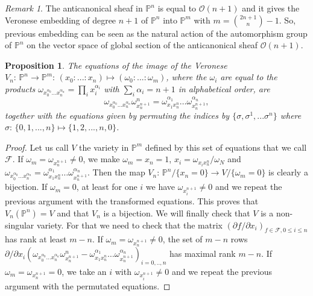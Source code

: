\documentclass[a4paper,10pt]{amsart}
\theoremstyle{plain}
\newtheorem{proposition}[theorem]{Proposition}
\theoremstyle{definition}
\theoremstyle{remark}
\newtheorem{remark}[theorem]{Remark}
\numberwithin{equation}{section}
\begin{document}
\begin{remark} The anticanonical sheaf in $\mathbb{P}^n$ is equal to $\mathcal{O}(n+1)$ \cite[8.20.1]{Hart} and it gives the Veronese embedding of degree $n+1$ of $\mathbb{P}^n$ into $\mathbb{P}^m$ with $m=\binom{2n+1}{n}-1$. So, previous embedding can be seen as the natural action of the automorphism group of $\mathbb{P}^n$ on the vector space of global section of the anticanonical sheaf $\mathcal{O}(n+1)$.
\end{remark}

\begin{proposition}\label{prop-eqP} The equations of the image of the Veronese $V_n:\,\mathbb{P}^n\rightarrow\mathbb{P}^m:\,(x_0:...:x_n)\mapsto(\omega_0:...:\omega_m)$, where the $\omega_i$ are equal to the products $\omega_{x_{0}^{\alpha_0}\dots x_{n}^{\alpha_n}}=\prod_{i}x_{i}^{\alpha_i}$ with $\sum_{i}\alpha_i=n+1$ in alphabetical order, are
	$$
	\omega_{x_{0}^{\alpha_0}\dots x_{n}^{\alpha_n}}\omega_{x_{n}^{n+1}}^n=\omega_{x_{1}x_{n}^n}^{\alpha_1}\dots\omega_{x_{n}^{n+1}}^{\alpha_n},
	$$
	together with the equations given by permuting the indices by $\{\sigma, \sigma^1,...\sigma^{n}\}$ where $\sigma:\,\{0,1,...,n\}\mapsto\{1,2,...,n,0\}$.
\end{proposition}

\begin{proof} Let us call $V$ the variety in $\mathbb{P}^m$ defined by this set of equations that we call $\mathcal{F}$. If $\omega_m=\omega_{x_{n}^{n+1}}\neq 0$, we make $\omega_m=x_n=1$, $x_i=\omega_{x_ix_{n}^{n}}/\omega_{N}$ and $\omega_{x_{0}^{\alpha_0}\dots x_{n}^{\alpha_n}}=\omega_{x_{1}x_{n}^n}^{\alpha_1}\dots\omega_{x_{n}^{n+1}}^{\alpha_n}$. Then the map $V_n:\,\mathbb{P}^n/ \{x_n=0\}\rightarrow V/\{\omega_m=0\}$ is clearly a bijection. If $\omega_m=0$, at least for one $i$ we have $\omega_{x_{i}^{n+1}}\neq0$ and we repeat the previous argument with the transformed equations. This proves that $V_n(\mathbb{P}^n)=V$ and that $V_n$ is a bijection. We will finally check that $V$ is a non-singular variety. For that we need to check that the matrix
$
(\partial f/\partial x_i)_{f\in\mathcal{F},0\leq i\leq n}
$	
has rank at least $m-n$. If $\omega_m=\omega_{x_{n}^{n+1}}\neq 0$, the set of $m-n$ rows $\partial/\partial x_i (\omega_{x_{0}^{\alpha_0}\dots x_{n}^{\alpha_n}}\omega_{x_{n}^{n+1}}^n-\omega_{x_{1}x_{n}^n}^{\alpha_1}\dots\omega_{x_{n}^{n+1}}^{\alpha_n})_{i=0,..,n}$ has maximal rank $m-n$. If $\omega_m=\omega_{x_{n}^{n+1}}= 0$, we take an $i$ with $\omega_{x_{i}^{n+1}}\neq0$ and we repeat the previous argument with the permutated equations.
\end{proof}
\end{document}
